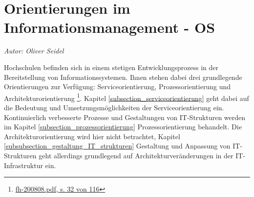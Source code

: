 \section{Orientierungen im Informationsmanagement - OS}
\textit{Autor: Oliver Seidel}

Hochschulen befinden sich in einem stetigen Entwicklungsprozess in der Bereitstellung von Informationssystemen. Ihnen stehen dabei drei grundlegende Orientierungen zur Verfügung: Serviceorientierung, Prozessorientierung und Architekturorientierung \footnote{\url{fh-200808.pdf, s. 32 von 116}}. Kapitel \ref{subsection_serviceorientierung} geht dabei auf die Bedeutung und Umsetzungsmöglichkeiten der Serviceorientierung ein. Kontinuierlich verbesserte Prozesse und Gestaltungen von IT-Strukturen werden im Kapitel \ref{subsection_prozessorientierung} Prozessorientierung behandelt. Die Architekturorientierung wird hier nicht betrachtet, Kapitel \ref{subsubsection_gestaltung_IT_strukturen} Gestaltung und Anpassung von IT-Strukturen geht allerdings grundlegend auf Architekturveränderungen in der IT-Infrastruktur ein.

